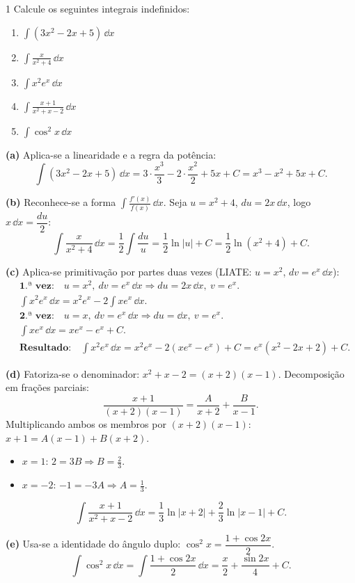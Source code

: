 \begin{exercisebox}{1}
  Calcule os seguintes integrais indefinidos:
  \begin{enumerate}[label=(\alph*)]
    \item $\displaystyle\int (3x^2-2x+5)\,\dd x$
    \item $\displaystyle\int \frac{x}{x^2+4}\,\dd x$
    \item $\displaystyle\int x^2 e^x\,\dd x$
    \item $\displaystyle\int \frac{x+1}{x^2+x-2}\,\dd x$
    \item $\displaystyle\int \cos^2 x\,\dd x$
  \end{enumerate}
\end{exercisebox}
\begin{solbox}
  \textbf{(a)} Aplica-se a linearidade e a regra da potência:
  \[
    \int (3x^2-2x+5)\,\dd x = 3\cdot\frac{x^3}{3} - 2\cdot\frac{x^2}{2} + 5x + C
    = x^3 - x^2 + 5x + C.
  \]

  \textbf{(b)} Reconhece-se a forma $\displaystyle\int \frac{f'(x)}{f(x)}\,\dd x$.
  Seja $u=x^2+4$, $du=2x\,\dd x$, logo $x\,\dd x=\dfrac{du}{2}$:
  \[
    \int \frac{x}{x^2+4}\,\dd x = \frac{1}{2}\int\frac{du}{u}
    = \frac{1}{2}\ln|u|+C = \frac{1}{2}\ln(x^2+4)+C.
  \]

  \textbf{(c)} Aplica-se primitivação por partes duas vezes (LIATE: $u=x^2$,
  $dv=e^x\,\dd x$):
  \begin{align*}
    &\textbf{1.ª vez:}\quad u=x^2,\ dv=e^x\,\dd x \Rightarrow du=2x\,\dd x,\ v=e^x.\\
    &\int x^2 e^x\,\dd x = x^2 e^x - 2\int x e^x\,\dd x.\\
    &\textbf{2.ª vez:}\quad u=x,\ dv=e^x\,\dd x \Rightarrow du=\dd x,\ v=e^x.\\
    &\int x e^x\,\dd x = xe^x - e^x + C.\\
    &\textbf{Resultado:}\quad \int x^2 e^x\,\dd x = x^2 e^x - 2(xe^x - e^x)+C
      = e^x(x^2-2x+2)+C.
  \end{align*}

  \textbf{(d)} Fatoriza-se o denominador: $x^2+x-2=(x+2)(x-1)$.
  Decomposição em frações parciais:
  \[
    \frac{x+1}{(x+2)(x-1)} = \frac{A}{x+2}+\frac{B}{x-1}.
  \]
  Multiplicando ambos os membros por $(x+2)(x-1)$: $x+1 = A(x-1)+B(x+2)$.
  \begin{itemize}
    \item $x=1$: $2=3B \Rightarrow B=\tfrac{2}{3}$.
    \item $x=-2$: $-1=-3A \Rightarrow A=\tfrac{1}{3}$.
  \end{itemize}
  \[
    \int \frac{x+1}{x^2+x-2}\,\dd x = \frac{1}{3}\ln|x+2|+\frac{2}{3}\ln|x-1|+C.
  \]

  \textbf{(e)} Usa-se a identidade do ângulo duplo: $\cos^2 x = \dfrac{1+\cos 2x}{2}$.
  \[
    \int \cos^2 x\,\dd x = \int \frac{1+\cos 2x}{2}\,\dd x
    = \frac{x}{2} + \frac{\sin 2x}{4} + C.
  \]
\end{solbox}

